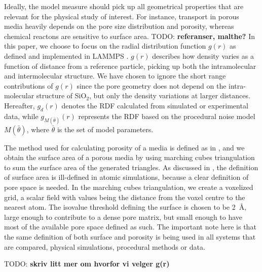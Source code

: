 \documentclass[aps,pre,twocolumn,letterpaper,floatfix,showpacs]{revtex4}
\newcommand{\todo}[1]{ {\color{Magenta} TODO: \color{Blue} \textbf{#1} }}
\begin{document}
Ideally, the model measure should pick up all geometrical properties that are relevant for the physical study of interest. For instance, transport in porous media heavily depends on the pore size distribution and porosity, whereas chemical reactons are sensitive to surface area. \todo{referanser, malthe?} In this paper, we choose to focus on the radial distribution function $g(r)$ as defined and implemented in LAMMPS \cite{plimpton1995fast}. $g(r)$ describes how density varies as a function of distance from a reference particle, picking up both the intramolecular and intermolecular structure. We have chosen to ignore the short range contributions of $g(r)$ since the pore geometry does not depend on the intra-molecular structure of SiO$_2$, but only the density variations at larger distances. Hereafter, $g_d(r)$ denotes the RDF calculated from simulated or experimental data, while $g_{M(\bar \theta)}(r)$ represents the RDF based on the procedural noise model $M(\bar \theta)$, where $\bar \theta$ is the set of model parameters. 

The method used for calculating porosity of a media is defined as in \cite{gelb1998characterization}, and we obtain the surface area of a porous media by using marching cubes triangulation to sum the surface area of the generated triangles. As discussed in \cite{gelb1998characterization}, the definition of surface area is ill-defined in atomic simulations, because a clear definition of pore space is needed. In the marching cubes triangulation, we create a voxelized grid, a scalar field with values being the distance from the voxel centre to the nearest atom. The isovalue threshold defining the surface is chosen to be \SI{2}{\angstrom}, large enough to contribute to a dense pore matrix, but small enough to have most of the available pore space defined as such. The important note here is that the same definition of both surface and porosity is being used in all systems that are compared, physical simulations, procedural methods or data. 

\todo{skriv litt mer om hvorfor vi velger g(r)}






\end{document}
